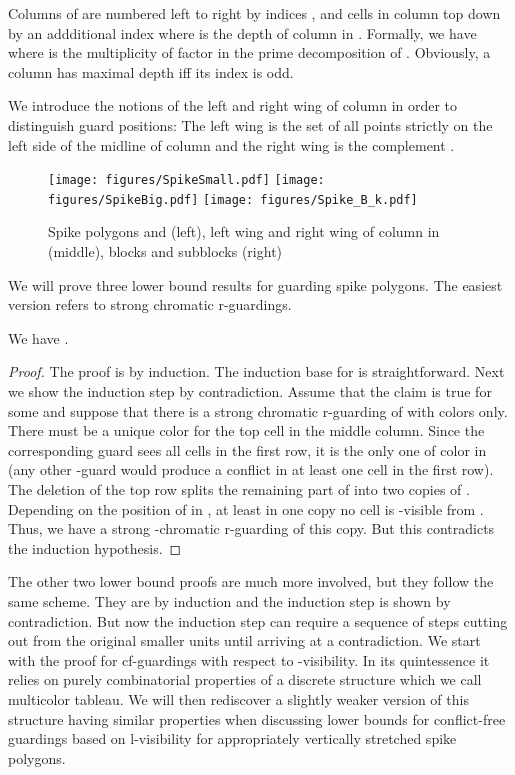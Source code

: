 \documentclass[a4paper,USenglish,numberwithinsect]{lipics}
\theoremstyle{plain}
\begin{document}
Columns of  are numbered  left to right by indices ,
and  cells in column  top down by an addditional index  where
 is the depth of column  in . Formally, we have
  where  is the multiplicity of  factor
 in the prime decomposition of .  
Obviously, a column has maximal depth  iff its index is odd.

We introduce the notions of the left and right wing of  column  in
order to distinguish
guard positions: The left wing  is the set of all points
strictly on the left side of the midline of column   and the
right wing is  the complement .

\begin{figure}
\centering
\texttt{[image: figures/SpikeSmall.pdf]} \qquad
\texttt{[image: figures/SpikeBig.pdf]}       \qquad
\texttt{[image: figures/Spike\_B\_k.pdf]}
\caption{Spike polygons  and  (left), left wing and right wing
of column  in  (middle), blocks and
  subblocks (right)}
\label{spikePoly}
\end{figure}




We will prove three lower bound results for guarding spike polygons. 
The easiest version refers to strong chromatic
r-guardings.

\noindent
\begin{theorem}
We have .
\end{theorem}
\begin{proof} The proof is by induction. The induction base for  is straightforward.
Next we show the induction step by contradiction. Assume that the claim is true for some    and suppose that there is  a
strong chromatic r-guarding of  with  colors only.
There must be a unique color  for the top cell in the middle
column. Since the
corresponding guard  sees all cells in the first row, it is
the only one of color  in 
(any other -guard  would produce a conflict in at least one cell in
the first row).
The deletion of the  top row splits the remaining part of  
into two copies of .
Depending on the position of  in , at least in one  copy  no cell is
-visible from .
Thus, we have  a strong -chromatic r-guarding  of this copy.
But this contradicts
 the induction hypothesis.\end{proof}

The other two lower bound proofs  are much more involved, but they follow the same scheme. They are by induction and the induction step is shown by contradiction. 
But now the  induction step  
can require a sequence of   steps cutting out from  the original 
 smaller units 
until arriving at a contradiction. We start with the proof  for
cf-guardings
with respect to -visibility. In its quintessence  
 it  relies on purely combinatorial properties of a  discrete structure which we call multicolor tableau.
We will then rediscover a slightly  weaker version of this structure having similar  properties when discussing lower bounds for conflict-free guardings
based on  l-visibility
for appropriately vertically stretched spike polygons.
\end{document}
